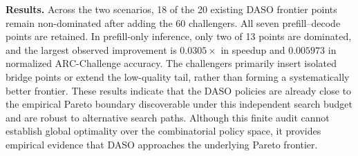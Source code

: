 \documentclass[letterpaper]{article} %
\numberwithin{equation}{section}
\numberwithin{table}{section}
\begin{document}
\textbf{Results.}
Across the two scenarios, 18 of the 20 existing DASO frontier points remain
non-dominated after adding the 60 challengers. All seven prefill--decode points
are retained. In prefill-only inference, only two of 13 points are dominated,
and the largest observed improvement is \(0.0305\times\) in speedup and
\(0.005973\) in normalized ARC-Challenge accuracy. The challengers primarily
insert isolated bridge points or extend the low-quality tail, rather than
forming a systematically better frontier. These results indicate that the
DASO policies are already close to the empirical Pareto boundary discoverable
under this independent search budget and are robust to alternative search
paths. Although this finite audit cannot establish global optimality over the
combinatorial policy space, it provides empirical evidence that DASO approaches the underlying Pareto frontier.
\end{document}
